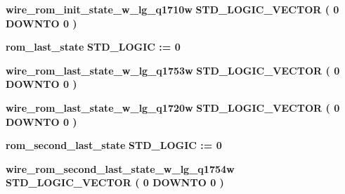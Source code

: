 \begin{DoxyCompactItemize}
{\bf wire\+\_\+rom\+\_\+init\+\_\+state\+\_\+w\+\_\+lg\+\_\+q1710w} {\bfseries \textcolor{comment}{S\+T\+D\+\_\+\+L\+O\+G\+I\+C\+\_\+\+V\+E\+C\+T\+OR}\textcolor{vhdlchar}{ }\textcolor{vhdlchar}{(}\textcolor{vhdlchar}{ }\textcolor{vhdlchar}{ } \textcolor{vhdldigit}{0} \textcolor{vhdlchar}{ }\textcolor{keywordflow}{D\+O\+W\+N\+TO}\textcolor{vhdlchar}{ }\textcolor{vhdlchar}{ } \textcolor{vhdldigit}{0} \textcolor{vhdlchar}{ }\textcolor{vhdlchar}{)}\textcolor{vhdlchar}{ }} 
\item 
{\bf rom\+\_\+last\+\_\+state} {\bfseries \textcolor{comment}{S\+T\+D\+\_\+\+L\+O\+G\+IC}\textcolor{vhdlchar}{ }\textcolor{vhdlchar}{ }\textcolor{vhdlchar}{\+:}\textcolor{vhdlchar}{=}\textcolor{vhdlchar}{ }\textcolor{vhdlchar}{ }\textcolor{vhdlchar}{\textquotesingle{}}\textcolor{vhdlchar}{ } \textcolor{vhdldigit}{0} \textcolor{vhdlchar}{ }\textcolor{vhdlchar}{\textquotesingle{}}\textcolor{vhdlchar}{ }} 
\item 
{\bf wire\+\_\+rom\+\_\+last\+\_\+state\+\_\+w\+\_\+lg\+\_\+q1753w} {\bfseries \textcolor{comment}{S\+T\+D\+\_\+\+L\+O\+G\+I\+C\+\_\+\+V\+E\+C\+T\+OR}\textcolor{vhdlchar}{ }\textcolor{vhdlchar}{(}\textcolor{vhdlchar}{ }\textcolor{vhdlchar}{ } \textcolor{vhdldigit}{0} \textcolor{vhdlchar}{ }\textcolor{keywordflow}{D\+O\+W\+N\+TO}\textcolor{vhdlchar}{ }\textcolor{vhdlchar}{ } \textcolor{vhdldigit}{0} \textcolor{vhdlchar}{ }\textcolor{vhdlchar}{)}\textcolor{vhdlchar}{ }} 
\item 
{\bf wire\+\_\+rom\+\_\+last\+\_\+state\+\_\+w\+\_\+lg\+\_\+q1720w} {\bfseries \textcolor{comment}{S\+T\+D\+\_\+\+L\+O\+G\+I\+C\+\_\+\+V\+E\+C\+T\+OR}\textcolor{vhdlchar}{ }\textcolor{vhdlchar}{(}\textcolor{vhdlchar}{ }\textcolor{vhdlchar}{ } \textcolor{vhdldigit}{0} \textcolor{vhdlchar}{ }\textcolor{keywordflow}{D\+O\+W\+N\+TO}\textcolor{vhdlchar}{ }\textcolor{vhdlchar}{ } \textcolor{vhdldigit}{0} \textcolor{vhdlchar}{ }\textcolor{vhdlchar}{)}\textcolor{vhdlchar}{ }} 
\item 
{\bf rom\+\_\+second\+\_\+last\+\_\+state} {\bfseries \textcolor{comment}{S\+T\+D\+\_\+\+L\+O\+G\+IC}\textcolor{vhdlchar}{ }\textcolor{vhdlchar}{ }\textcolor{vhdlchar}{\+:}\textcolor{vhdlchar}{=}\textcolor{vhdlchar}{ }\textcolor{vhdlchar}{ }\textcolor{vhdlchar}{\textquotesingle{}}\textcolor{vhdlchar}{ } \textcolor{vhdldigit}{0} \textcolor{vhdlchar}{ }\textcolor{vhdlchar}{\textquotesingle{}}\textcolor{vhdlchar}{ }} 
\item 
{\bf wire\+\_\+rom\+\_\+second\+\_\+last\+\_\+state\+\_\+w\+\_\+lg\+\_\+q1754w} {\bfseries \textcolor{comment}{S\+T\+D\+\_\+\+L\+O\+G\+I\+C\+\_\+\+V\+E\+C\+T\+OR}\textcolor{vhdlchar}{ }\textcolor{vhdlchar}{(}\textcolor{vhdlchar}{ }\textcolor{vhdlchar}{ } \textcolor{vhdldigit}{0} \textcolor{vhdlchar}{ }\textcolor{keywordflow}{D\+O\+W\+N\+TO}\textcolor{vhdlchar}{ }\textcolor{vhdlchar}{ } \textcolor{vhdldigit}{0} \textcolor{vhdlchar}{ }\textcolor{vhdlchar}{)}\textcolor{vhdlchar}{ }} 

\end{DoxyCompactItemize}
